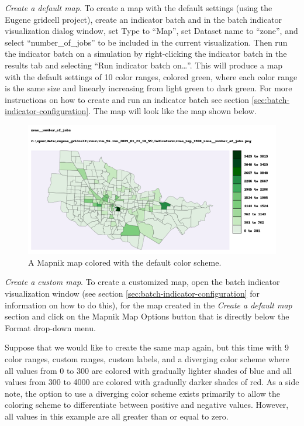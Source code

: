 \emph{Create a default map}. 
To create a map with the default settings 
(using the Eugene gridcell project), create an indicator batch and 
in the batch indicator visualization dialog window, set Type to 
``Map'', set Dataset name to ``zone'', and select ``number_of_jobs'' to be 
included in the current visualization.  Then run the indicator batch on 
a simulation by right-clicking the indicator batch in the results 
tab and selecting ``Run indicator batch on\ldots''. 
This will produce a map with the default 
settings of 10 color ranges, colored green, where each color range is 
the same size and linearly increasing from light green to dark green.
For more instructions on how to create and run an indicator batch see section
\ref{sec:batch-indicator-configuration}. The map will look like the 
map shown below.

\begin{figure}[ht]
\begin{center}
\includegraphics[width=\textwidth]{part-gui/images/sample-map-default-settings.png}
\end{center}
\caption{A Mapnik map colored with the default color scheme.}
\label{fig:sample-map-default-settings}
\end{figure}
\clearpage

\emph{Create a custom map}. 
To create a customized map, 
open the batch indicator visualization window (see section 
\ref{sec:batch-indicator-configuration} for information on 
how to do this), for the map created in the \emph{Create a default map}
section and click on the Mapnik Map Options button that is directly 
below the Format drop-down menu.

Suppose that we would like to create the same map again, but this time 
with 9 color ranges, custom ranges, custom labels, and a diverging color 
scheme where all values from 0 to 300 are colored with gradually lighter 
shades of blue and all values from 300 to 4000 are colored with gradually 
darker shades of red. As a side note, the option to use a diverging color 
scheme exists primarily to allow the coloring scheme to differentiate 
between positive and negative values.  However, all values in 
this example are all greater than or equal to zero.

